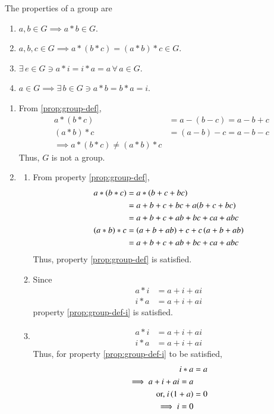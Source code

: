 \begin{enumerate}[label=\arabic*.,ref=\thesubsection.\theenumi]
\begin{enumerate}
\end{enumerate}
\solution The properties of a group are 
\begin{enumerate}
	\item $a,b \in G \implies a*b \in G$.
	\item $a,b,c \in G \implies a*(b*c) = (a*b)*c \in G$.
		\label{prop:group-def}
	\item $\exists \, e \in G \ni a*i = i*a = a \, \forall \, a \in G$.
		\label{prop:group-def-i}
	\item $a \in G \implies \exists \, b \in G \ni a*b = b*a = i$.
		\label{prop:group-def-inv}
\end{enumerate}
\begin{enumerate}
	\item From
		\ref{prop:group-def},
		\begin{align}
			a*(b*c) &= a-(b-c) = a-b+c
			\\
			(a*b)*c &= (a-b)-c = a-b-c
			\\
			\implies 
			a*(b*c) 
			\ne			
			(a*b)*c
		\end{align}
		Thus, $G$ is not a group.
	\item 
		\label{prop:2.1.1b}
		\begin{enumerate}
	\item 
		From property
		\ref{prop:group-def},
		\begin{align}
			a*(b*c) &= a*(b+c+bc) 
			\\
			&= a+b+c+bc+a(b+c+bc)
			\\
			&= a+b+c + ab+bc+ca +abc
			\\
			(a*b)*c &= \left(a+b+ab\right)+c+c\left(a+b+ab\right)
			\\
			&= a+b+c+ab+bc+ca+abc
		\end{align}
		Thus, property 
		\ref{prop:group-def}
		is satisfied.
	\item Since
		\begin{align}
			a*i &= a+i+ai
			\\
			i*a &= a+i+ai
		\end{align}
		property
		\ref{prop:group-def-i} is satisfied.
	\item 
		\begin{align}
			a*i &= a+i+ai
			\\
			i*a &= a+i+ai
		\end{align}
		Thus, for 
		property
		\ref{prop:group-def-i} to be satisfied,
		\begin{align}
			i*a &= a
			\\
			\implies a+i+ai = a
			\\
			\text{or, }
			i\left(1+a\right) &= 0
			\\
			\implies i = 0
		\end{align}


\end{enumerate}
\end{enumerate}
\end{enumerate}
